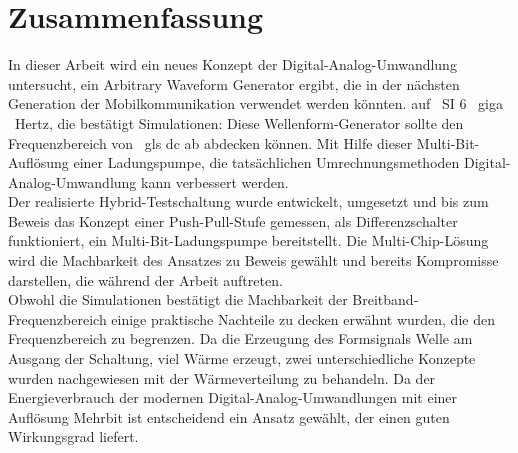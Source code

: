 \newpage
\chapter*{Zusammenfassung}

In dieser Arbeit wird ein neues Konzept der Digital-Analog-Umwandlung untersucht, ein Arbitrary Waveform Generator ergibt, die in der n\"achsten Generation der Mobilkommunikation verwendet werden k\"onnten.
auf \ SI {6} {\ giga \ Hertz}, die best\"atigt Simulationen: Diese Wellenform-Generator sollte den Frequenzbereich von \ gls {dc ab} abdecken k\"onnen.
Mit Hilfe dieser Multi-Bit-Aufl\"osung einer Ladungspumpe, die tats\"achlichen Umrechnungsmethoden Digital-Analog-Umwandlung kann verbessert werden. \\
Der realisierte Hybrid-Testschaltung wurde entwickelt, umgesetzt und bis zum Beweis das Konzept einer Push-Pull-Stufe gemessen, als Differenzschalter funktioniert, ein Multi-Bit-Ladungspumpe bereitstellt.
Die Multi-Chip-L\"osung wird die Machbarkeit des Ansatzes zu Beweis gew\"ahlt und bereits Kompromisse darstellen, die w\"ahrend der Arbeit auftreten. \\
Obwohl die Simulationen best\"atigt die Machbarkeit der Breitband-Frequenzbereich einige praktische Nachteile zu decken erw\"ahnt wurden, die den Frequenzbereich zu begrenzen.
Da die Erzeugung des Formsignals Welle am Ausgang der Schaltung, viel W\"arme erzeugt, zwei unterschiedliche Konzepte wurden nachgewiesen mit der W\"armeverteilung zu behandeln.
Da der Energieverbrauch der modernen Digital-Analog-Umwandlungen mit einer Aufl\"osung Mehrbit ist entscheidend ein Ansatz gew\"ahlt, der einen guten Wirkungsgrad liefert.